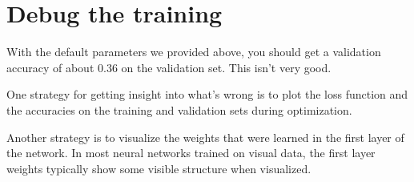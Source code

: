 \documentclass[11pt]{article}
\begin{document}
    \hypertarget{debug-the-training}{%
\section{Debug the training}\label{debug-the-training}}

With the default parameters we provided above, you should get a
validation accuracy of about 0.36 on the validation set. This isn't very
good.

One strategy for getting insight into what's wrong is to plot the loss
function and the accuracies on the training and validation sets during
optimization.

Another strategy is to visualize the weights that were learned in the
first layer of the network. In most neural networks trained on visual
data, the first layer weights typically show some visible structure when
visualized.
\end{document}
